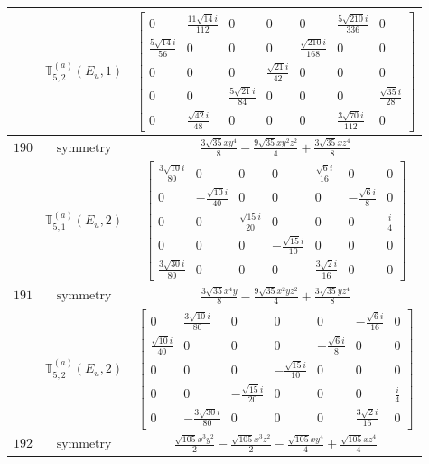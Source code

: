 \documentclass[fleqn,8pt,landscape]{jsarticle}
\begin{document}
\begin{longtable}{ccc}
$  $ & $ \mathbb{T}_{5,2}^{(a)}(E_{u},1) $ & $ \begin{bmatrix} 0 & \frac{11 \sqrt{14} i}{112} & 0 & 0 & 0 & \frac{5 \sqrt{210} i}{336} & 0 \\ \frac{5 \sqrt{14} i}{56} & 0 & 0 & 0 & \frac{\sqrt{210} i}{168} & 0 & 0 \\ 0 & 0 & 0 & \frac{\sqrt{21} i}{42} & 0 & 0 & 0 \\ 0 & 0 & \frac{5 \sqrt{21} i}{84} & 0 & 0 & 0 & \frac{\sqrt{35} i}{28} \\ 0 & \frac{\sqrt{42} i}{48} & 0 & 0 & 0 & \frac{3 \sqrt{70} i}{112} & 0 \end{bmatrix} $ \\ \hline
$ 190 $ & $ \text{symmetry} $ & $ \frac{3 \sqrt{35} x y^{4}}{8} - \frac{9 \sqrt{35} x y^{2} z^{2}}{4} + \frac{3 \sqrt{35} x z^{4}}{8} $ \\
$  $ & $ \mathbb{T}_{5,1}^{(a)}(E_{u},2) $ & $ \begin{bmatrix} \frac{3 \sqrt{10} i}{80} & 0 & 0 & 0 & \frac{\sqrt{6} i}{16} & 0 & 0 \\ 0 & - \frac{\sqrt{10} i}{40} & 0 & 0 & 0 & - \frac{\sqrt{6} i}{8} & 0 \\ 0 & 0 & \frac{\sqrt{15} i}{20} & 0 & 0 & 0 & \frac{i}{4} \\ 0 & 0 & 0 & - \frac{\sqrt{15} i}{10} & 0 & 0 & 0 \\ \frac{3 \sqrt{30} i}{80} & 0 & 0 & 0 & \frac{3 \sqrt{2} i}{16} & 0 & 0 \end{bmatrix} $ \\ \hline
$ 191 $ & $ \text{symmetry} $ & $ \frac{3 \sqrt{35} x^{4} y}{8} - \frac{9 \sqrt{35} x^{2} y z^{2}}{4} + \frac{3 \sqrt{35} y z^{4}}{8} $ \\
$  $ & $ \mathbb{T}_{5,2}^{(a)}(E_{u},2) $ & $ \begin{bmatrix} 0 & \frac{3 \sqrt{10} i}{80} & 0 & 0 & 0 & - \frac{\sqrt{6} i}{16} & 0 \\ \frac{\sqrt{10} i}{40} & 0 & 0 & 0 & - \frac{\sqrt{6} i}{8} & 0 & 0 \\ 0 & 0 & 0 & - \frac{\sqrt{15} i}{10} & 0 & 0 & 0 \\ 0 & 0 & - \frac{\sqrt{15} i}{20} & 0 & 0 & 0 & \frac{i}{4} \\ 0 & - \frac{3 \sqrt{30} i}{80} & 0 & 0 & 0 & \frac{3 \sqrt{2} i}{16} & 0 \end{bmatrix} $ \\ \hline
$ 192 $ & $ \text{symmetry} $ & $ \frac{\sqrt{105} x^{3} y^{2}}{2} - \frac{\sqrt{105} x^{3} z^{2}}{2} - \frac{\sqrt{105} x y^{4}}{4} + \frac{\sqrt{105} x z^{4}}{4} $ \\

\end{longtable}
\end{document}
